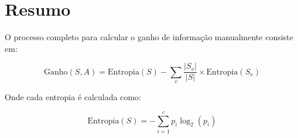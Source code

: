 \documentclass[12pt,a4paper]{article}
\begin{document}
\section{Resumo}

O processo completo para calcular o ganho de informação manualmente consiste em:

\begin{equation}
\boxed{\text{Ganho}(S, A) = \text{Entropia}(S) - \sum_{v} \frac{|S_v|}{|S|} \times \text{Entropia}(S_v)}
\end{equation}

Onde cada entropia é calculada como:

\begin{equation}
\boxed{\text{Entropia}(S) = -\sum_{i=1}^{c} p_i \log_2(p_i)}
\end{equation}
\end{document}
